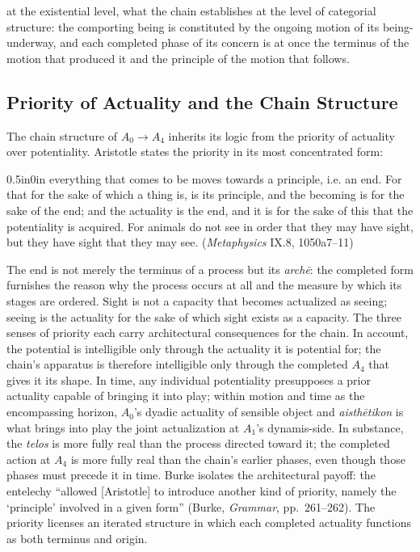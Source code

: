 \documentclass{article}
\begin{document}
at the existential level, what the chain establishes at the level of categorial structure: the comporting being is constituted by the ongoing motion of its being-underway, and each completed phase of its concern is at once the terminus of the motion that produced it and the principle of the motion that follows.

\subsection{Priority of Actuality and the Chain Structure}

The chain structure of $A_0 \rightarrow A_4$ inherits its logic from the priority of actuality over potentiality. Aristotle states the priority in its most concentrated form:
\begin{adjustwidth}{0.5in}{0in}
everything that comes to be moves towards a principle, i.e. an end. For that for the sake of which a thing is, is its principle, and the becoming is for the sake of the end; and the actuality is the end, and it is for the sake of this that the potentiality is acquired. For animals do not see in order that they may have sight, but they have sight that they may see. (\textit{Metaphysics} IX.8, 1050a7--11)
\end{adjustwidth}
The end is not merely the terminus of a process but its \textit{archē}: the completed form furnishes the reason why the process occurs at all and the measure by which its stages are ordered. Sight is not a capacity that becomes actualized as seeing; seeing is the actuality for the sake of which sight exists as a capacity. The three senses of priority each carry architectural consequences for the chain. In account, the potential is intelligible only through the actuality it is potential for; the chain's apparatus is therefore intelligible only through the completed $A_4$ that gives it its shape. In time, any individual potentiality presupposes a prior actuality capable of bringing it into play; within motion and time as the encompassing horizon, $A_0$'s dyadic actuality of sensible object and \textit{aisthētikon} is what brings into play the joint actualization at $A_1$'s dynamis-side. In substance, the \textit{telos} is more fully real than the process directed toward it; the completed action at $A_4$ is more fully real than the chain's earlier phases, even though those phases must precede it in time. Burke isolates the architectural payoff: the entelechy ``allowed [Aristotle] to introduce another kind of priority, namely the `principle' involved in a given form'' (Burke, \textit{Grammar}, pp.~261--262). The priority licenses an iterated structure in which each completed actuality functions as both terminus and origin.
\end{document}
